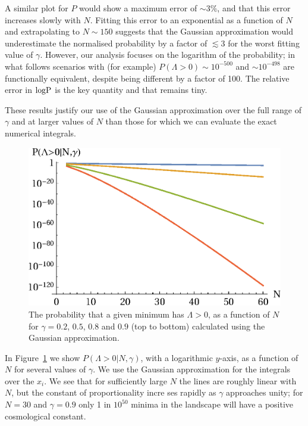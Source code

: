 \documentclass[12pt]{article}
\begin{document}
A similar plot for $P$ would show a maximum error of $\sim 3\%$, and that this error increases slowly with $N$. Fitting this error to an exponential as a function of $N$ and extrapolating to $N\sim 150$ suggests that the Gaussian approximation would underestimate the normalised probability by a factor of $\lesssim 3$ for the worst fitting value of $\gamma$. However, our analysis focuses on the logarithm of the probability; in what follows scenarios with (for example) $P(\Lambda>0) \sim 10^{-500}$ and $\sim 10^{-498}$ are functionally equivalent, despite being different by a factor of 100. The relative error in $\rm{log} P$ is the key quantity and that remains tiny.

These results justify our use of the Gaussian approximation over the full range of $\gamma$ and at larger values of $N$ than those for which we can evaluate the exact numerical integrals. 

\begin{figure} 
  \centering
  \includegraphics[width=.6 \linewidth]{Fig6.eps}
  \caption{The probability that a given minimum has $\Lambda>0$, as a function of $N$ for $\gamma=0.2$, $0.5$, $0.8$ and $0.9$ (top to bottom) calculated using the Gaussian approximation.}
  \label{PVaryingWithNGaussian}
\end{figure}
  
In  Figure~\ref{PVaryingWithNGaussian} we show $P(\Lambda>0|N,\gamma)$, with a logarithmic $y$-axis, as a function of $N$ for several values of $\gamma$. We use the Gaussian approximation for the integrals over the $x_i$. We see that for sufficiently large $N$ the lines are roughly linear with $N$, but the constant of proportionality incre
ses rapidly as $\gamma$ approaches unity; for $N=30$ and $\gamma = 0.9$ only 1 in $10^{50}$ minima in the landscape will have a positive cosmological constant.
\end{document}
